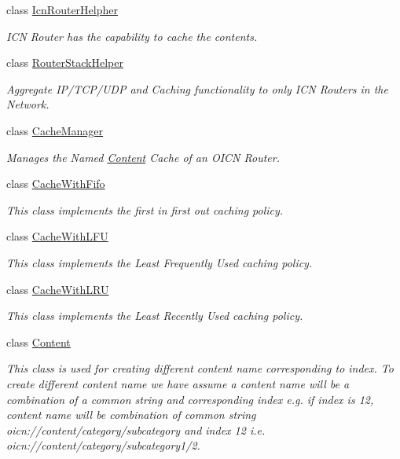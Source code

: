 \begin{DoxyCompactItemize}
class \hyperlink{classns3_1_1IcnRouterHelpher}{Icn\-Router\-Helpher}
\begin{DoxyCompactList}\small\item\em I\-C\-N Router has the capability to cache the contents. \end{DoxyCompactList}\item 
class \hyperlink{classns3_1_1RouterStackHelper}{Router\-Stack\-Helper}
\begin{DoxyCompactList}\small\item\em Aggregate I\-P/\-T\-C\-P/\-U\-D\-P and Caching functionality to only I\-C\-N Routers in the Network. \end{DoxyCompactList}\item 
class \hyperlink{classns3_1_1CacheManager}{Cache\-Manager}
\begin{DoxyCompactList}\small\item\em Manages the Named \hyperlink{classns3_1_1Content}{Content} Cache of an O\-I\-C\-N Router. \end{DoxyCompactList}\item 
class \hyperlink{classns3_1_1CacheWithFifo}{Cache\-With\-Fifo}
\begin{DoxyCompactList}\small\item\em This class implements the first in first out caching policy. \end{DoxyCompactList}\item 
class \hyperlink{classns3_1_1CacheWithLFU}{Cache\-With\-L\-F\-U}
\begin{DoxyCompactList}\small\item\em This class implements the Least Frequently Used caching policy. \end{DoxyCompactList}\item 
class \hyperlink{classns3_1_1CacheWithLRU}{Cache\-With\-L\-R\-U}
\begin{DoxyCompactList}\small\item\em This class implements the Least Recently Used caching policy. \end{DoxyCompactList}\item 
class \hyperlink{classns3_1_1Content}{Content}
\begin{DoxyCompactList}\small\item\em This class is used for creating different content name corresponding to index. To create different content name we have assume a content name will be a combination of a common string and corresponding index e.\-g. if index is 12, content name will be combination of common string oicn\-://content/category/subcategory and index 12 i.\-e. oicn\-://content/category/subcategory1/2. \end{DoxyCompactList}\item 

\end{DoxyCompactItemize}
